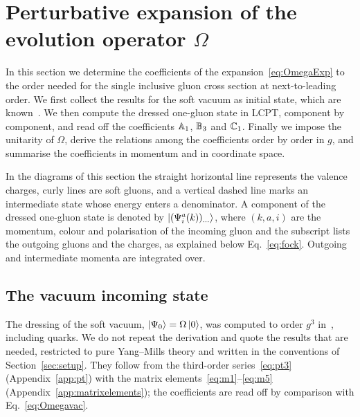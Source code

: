 \section{Perturbative expansion of the evolution operator \texorpdfstring{$\Omega$}{Omega}}\label{sec:omega}

In this section we determine the coefficients of the expansion~\eqref{eq:OmegaExp} to the order needed for the single inclusive gluon cross section at next-to-leading order. We first collect the results for the soft vacuum as initial state, which are known~\cite{Lublinsky:2016meo}. We then compute the dressed one-gluon state in LCPT, component by component, and read off the coefficients $\mathbb{A}_1$, $\mathbb{B}_3$ and $\mathbb{C}_1$. Finally we impose the unitarity of $\Omega$, derive the relations among the coefficients order by order in $g$, and summarise the coefficients in momentum and in coordinate space.

In the diagrams of this section the straight horizontal line represents the valence charges, curly lines are soft gluons, and a vertical dashed line marks an intermediate state whose energy enters a denominator. A component of the dressed one-gluon state is denoted by $\ket{(\Psi^a_i(k))_{\dots}}$, where $(k,a,i)$ are the momentum, colour and polarisation of the incoming gluon and the subscript lists the outgoing gluons and the charges, as explained below Eq.~\eqref{eq:fock}. Outgoing and intermediate momenta are integrated over.

\subsection{The vacuum incoming state}\label{sec:vacin}

The dressing of the soft vacuum, $\ket{\Psi_0}=\Omega\ket0$, was computed to order $g^3$ in~\cite{Lublinsky:2016meo}, including quarks. We do not repeat the derivation and quote the results that are needed, restricted to pure Yang--Mills theory and written in the conventions of Section~\ref{sec:setup}. They follow from the third-order series~\eqref{eq:pt3} (Appendix~\ref{app:pt}) with the matrix elements~\eqref{eq:m1}--\eqref{eq:m5} (Appendix~\ref{app:matrixelements}); the coefficients are read off by comparison with Eq.~\eqref{eq:Omegavac}.


